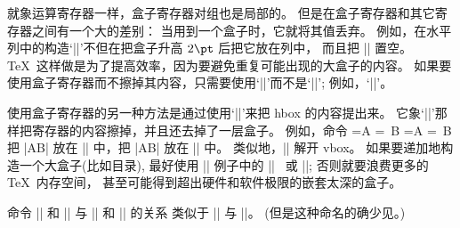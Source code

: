 \danger 就象运算寄存器一样，盒子寄存器对组也是局部的。%
但是在盒子寄存器和其它寄存器之间有一个大的差别：
当用到一个盒子时，它就将其值丢弃。%
例如，在水平列中的构造`||'不但在把盒子升高 $2\pt$ 后把它放在列中，
而且把 || 置空。%
 \TeX\ 这样做是为了提高效率，因为要避免重复可能出现的大盒子的内容。%
如果要使用盒子寄存器而不擦掉其内容，只需要使用`|\copy|'而不是`|\box|';
例如，`||'。

\danger 使用盒子寄存器的另一种方法是通过使用`|\unhbox|'来把 hbox 的内容提出来。%
它象`|\box|'那样把寄存器的内容擦掉，并且还去掉了一层盒子。%
例如，命令
\begintt
{}=\hbox{A} =\hbox{ B}
=\hbox{A} =\hbox{ B}
\endtt
把 |\hbox{\hbox{A}B}| 放在 || 中，把 |\hbox{AB}| 放在 || 中。%
类似地，|\unvbox| 解开 vbox。%
如果要递加地构造一个大盒子(比如目录), 最好使用 || 例子中的 |\unhbox|~%
或 |\unvbox|;
否则就要浪费更多的 \TeX\ 内存空间，
甚至可能得到超出硬件和软件极限的嵌套太深的盒子。

\danger 命令 |\unhcopy| 和 |\unvcopy| 与 |\unhbox| 和 |\unvbox| 的关系%
类似于 |\copy| 与 |\box|。%
(但是这种命名的确少见。)

